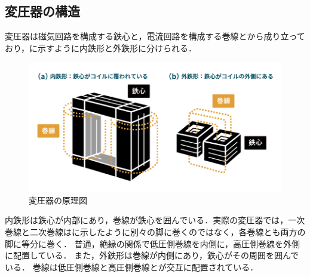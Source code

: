 \subsection{変圧器の構造}
変圧器は磁気回路を構成する鉄心と，電流回路を構成する巻線とから成り立っており，に示すように内鉄形と外鉄形に分けられる．
\begin{figure}[h]
	\centering
	\includegraphics[scale=0.45]{./fig/01-1.png}
	\caption{変圧器の原理図\cite{genri}}
	\label{fig:kouzo}
\end{figure}
内鉄形は鉄心が内部にあり，巻線が鉄心を囲んでいる．実際の変圧器では，一次巻線と二次巻線はに示したように別々の脚に巻くのではなく，各巻線とも両方の脚に等分に巻く．
普通，絶縁の関係で低圧側巻線を内側に，高圧側巻線を外側に配置している．
また，外鉄形は巻線が内側にあり，鉄心がその周囲を囲んでいる．
巻線は低圧側巻線と高圧側巻線とが交互に配置されている．
